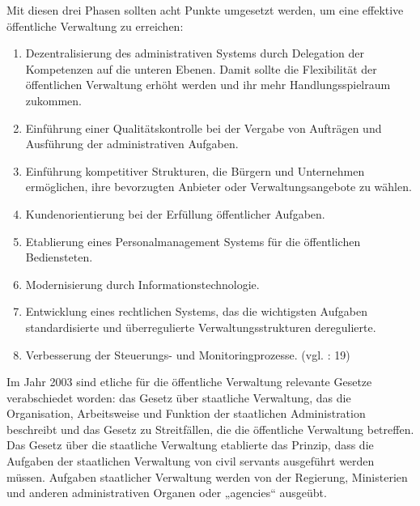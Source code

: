 Mit diesen drei Phasen sollten acht Punkte umgesetzt werden, um eine effektive öffentliche Verwaltung zu erreichen:
\begin{enumerate}[label= {\arabic*}),leftmargin=*]\itemsep1pt \parskip0pt 
\item Dezentralisierung des administrativen Systems durch Delegation der Kompetenzen auf die unteren Ebenen. Damit sollte die Flexibilität der öffentlichen Verwaltung erhöht werden und ihr mehr Handlungsspielraum zukommen.
\item Einführung einer Qualitätskontrolle bei der Vergabe von Aufträgen und Ausführung der administrativen Aufgaben.
\item Einführung kompetitiver Strukturen, die Bürgern und Unternehmen ermöglichen, ihre bevorzugten Anbieter oder Verwaltungsangebote zu wählen.
\item Kundenorientierung bei der Erfüllung öffentlicher Aufgaben.
\item Etablierung eines Personalmanagement Systems für die öffentlichen Bediensteten.
\item Modernisierung durch Informationstechnologie.
\item Entwicklung eines rechtlichen Systems, das die wichtigsten Aufgaben standardisierte und überregulierte Verwaltungsstrukturen deregulierte.
\item Verbesserung der Steuerungs- und Monitoringprozesse. (vgl. \cite{govmont03} : 19)
\end{enumerate}

Im Jahr 2003 sind etliche für die öffentliche Verwaltung relevante Gesetze verabschiedet worden: das Gesetz über staatliche Verwaltung, das die Organisation, Arbeitsweise und Funktion der staatlichen Administration beschreibt und das Gesetz zu Streitfällen, die die öffentliche Verwaltung betreffen. Das Gesetz über die staatliche Verwaltung etablierte das Prinzip, dass die Aufgaben der staatlichen Verwaltung von civil servants ausgeführt werden müssen. Aufgaben staatlicher Verwaltung werden von der Regierung, Ministerien und anderen administrativen Organen oder „agencies“ ausgeübt.

